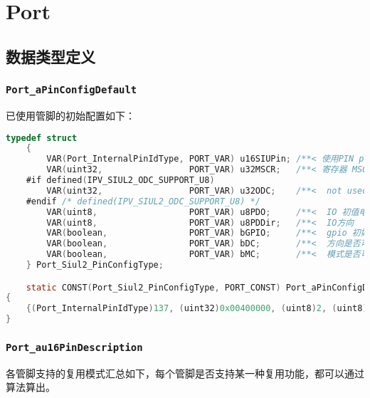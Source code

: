 \section{Port}

\subsection{数据类型定义}

\subsubsection{\lstinline{Port_aPinConfigDefault}}

已使用管脚的初始配置如下：

\begin{lstlisting}[language=C,style=C]
    typedef struct
    {
        VAR(Port_InternalPinIdType, PORT_VAR) u16SIUPin; /**< 使用PIN pcr number @brief Pin Defined on Part SIUx */
        VAR(uint32,                 PORT_VAR) u32MSCR;   /**< 寄存器 MSCR 初值    @brief Pad Control Register */
    #if defined(IPV_SIUL2_ODC_SUPPORT_U8)
        VAR(uint32,                 PORT_VAR) u32ODC;    /**<  not used          @brief Pad Output Driver Control Configuration */
    #endif /* defined(IPV_SIUL2_ODC_SUPPORT_U8) */
        VAR(uint8,                  PORT_VAR) u8PDO;     /**<  IO 初值电平 0 low 1 high 2 not care           @brief Pad Data Output */
        VAR(uint8,                  PORT_VAR) u8PDDir;   /**<  IO方向   0 in 1 out  2 inout             @brief Pad Data Direction */
        VAR(boolean,                PORT_VAR) bGPIO;     /**<  gpio 初始模式                  @brief GPIO initial mode*/
        VAR(boolean,                PORT_VAR) bDC;       /**<  方向是否可变，不可用                  @brief Direction changebility*/
        VAR(boolean,                PORT_VAR) bMC;       /**<  模式是否可变                  @brief Mode changebility*/
    } Port_Siul2_PinConfigType;

    static CONST(Port_Siul2_PinConfigType, PORT_CONST) Port_aPinConfigDefault[PORT_MAX_CONFIGURED_PADS_U16]=
{
    {(Port_InternalPinIdType)137, (uint32)0x00400000, (uint8)2, (uint8)0, (boolean)FALSE, (boolean)FALSE, (boolean)FALSE}
}
\end{lstlisting}

\subsubsection{\lstinline{Port_au16PinDescription}}
各管脚支持的复用模式汇总如下，每个管脚是否支持某一种复用功能，都可以通过算法算出。

